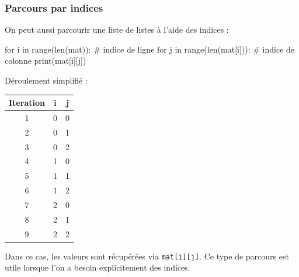 \documentclass[11pt]{article}
\begin{document}
		\medskip
		
		\subsubsection*{Parcours par indices}
		
		On peut aussi parcourir une liste de listes à l’aide des indices :
		
		\begin{python}
		for i in range(len(mat)):	# indice de ligne
			for j in range(len(mat[i])):	# indice de colonne
				print(mat[i][j])\end{python}
		
		Déroulement simplifié :
		
		\begin{center}
			\begin{tabular}{|c|c|c|}
				\hline
				\textbf{Iteration} & \textbf{i} & \textbf{j} \\
				\hline
				1 & 0 & 0 \\
				\hline
				2 & 0 & 1 \\
				\hline
				3 & 0 & 2 \\
				\hline
				4 & 1 & 0 \\
				\hline
				5 & 1 & 1 \\
				\hline
				6 & 1 & 2 \\
				\hline
				7 & 2 & 0 \\
				\hline
				8 & 2 & 1 \\
				\hline
				9 & 2 & 2 \\
				\hline
			\end{tabular}
		\end{center}
		
		\medskip
		
		Dans ce cas, les valeurs sont récupérées via \texttt{mat[i][j]}.  
		Ce type de parcours est utile lorsque l’on a besoin explicitement des indices.
		
\end{document}
